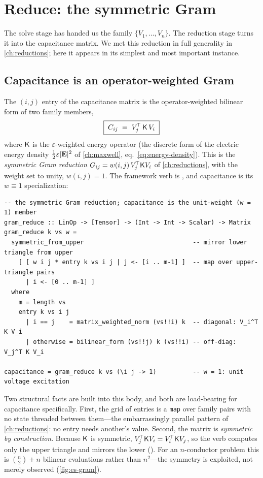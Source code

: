 \section{Reduce: the symmetric Gram}
\label{sec:es-reduce}

The solve stage has handed us the family $\{V_1,\dots,V_n\}$. The reduction stage
turns it into the capacitance matrix. We met this reduction in full generality in
\cref{ch:reductions}; here it appears in its simplest and most important instance.

\subsection{Capacitance is an operator-weighted Gram}

The $(i,j)$ entry of the capacitance matrix is the operator-weighted bilinear form
of two family members,
\begin{equation}
  \boxed{\;C_{ij} \;=\; V_j^{\!\top}\,\mathsf{K}\,V_i\;}
  \label{eq:cap-gram-ch39}
\end{equation}
where $\mathsf{K}$ is the $\varepsilon$-weighted energy operator (the discrete form of
the electric energy density $\tfrac12\varepsilon\lvert\mathbf{E}\rvert^2$ of \cref{ch:maxwell},
eq.~\eqref{eq:energy-density}). This is the \emph{symmetric Gram reduction}
$G_{ij}=w(i,j)\,V_j^{\!\top}\mathsf{K} V_i$ of \cref{ch:reductions}, with the weight set
to unity, $w(i,j)=1$. The framework verb is , and capacitance is
its $w\equiv1$ specialization:
\begin{lstlisting}[style=l4style]
-- the symmetric Gram reduction; capacitance is the unit-weight (w = 1) member
gram_reduce :: LinOp -> [Tensor] -> (Int -> Int -> Scalar) -> Matrix
gram_reduce k vs w =
  symmetric_from_upper                              -- mirror lower triangle from upper
    [ [ w i j * entry k vs i j | j <- [i .. m-1] ]  -- map over upper-triangle pairs
      | i <- [0 .. m-1] ]
  where
    m = length vs
    entry k vs i j
      | i == j    = matrix_weighted_norm (vs!!i) k  -- diagonal: V_i^T K V_i
      | otherwise = bilinear_form (vs!!j) k (vs!!i) -- off-diag:  V_j^T K V_i

capacitance = gram_reduce k vs (\i j -> 1)          -- w = 1: unit voltage excitation
\end{lstlisting}
Two structural facts are built into this body, and both are load-bearing for
capacitance specifically. First, the grid of entries is a \texttt{map} over family
pairs with no state threaded between them---the embarrassingly parallel pattern of
\cref{ch:reductions}: no entry needs another's value. Second, the matrix is
\emph{symmetric by construction}. Because $\mathsf{K}$ is symmetric,
$V_j^{\!\top}\mathsf{K} V_i = V_i^{\!\top}\mathsf{K} V_j$, so the verb computes only the upper
triangle and mirrors the lower (). For an $n$-conductor
problem this is $\binom{n}{2}+n$ bilinear evaluations rather than $n^2$---the
symmetry is exploited, not merely observed (\cref{fig:es-gram}).


